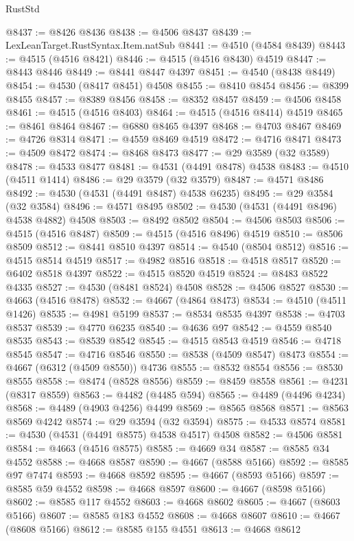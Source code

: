 \begin{lexlean}{RustStd}
\begin{coremodule}
{\begin{coremodule}
{{{{{{{{{{{{{{{{{{{{{{{{{{{{{{{{{{{{{{{{{{{{{{{{{{{{{{{@8437 := @8426 @8436
@8438 := @4506 @8437
@8439 := LexLeanTarget.RustSyntax.Item.natSub
@8441 := @4510 (@4584 @8439)
@8443 := @4515 (@4516 @8421)
@8446 := @4515 (@4516 @8430) @4519
@8447 := @8443 @8446
@8449 := @8441 @8447 @4397
@8451 := @4540 (@8438 @8449)
@8454 := @4530 (@8417 @8451) @4508
@8455 := @8410 @8454
@8456 := @8399 @8455
@8457 := @8389 @8456
@8458 := @8352 @8457
@8459 := @4506 @8458
@8461 := @4515 (@4516 @8403)
@8464 := @4515 (@4516 @8414) @4519
@8465 := @8461 @8464
@8467 := @6880 @8465 @4397
@8468 := @4703 @8467
@8469 := @4726 @8314
@8471 := @4559 @8469 @4519
@8472 := @4716 @8471
@8473 := @4509 @8472
@8474 := @8468 @8473
@8477 := @29 @3589 (@32 @3589)
@8478 := @4533 @8477
@8481 := @4531 (@4491 @8478) @4538
@8483 := @4510 (@4511 @1414)
@8486 := @29 @3579 (@32 @3579)
@8487 := @4571 @8486
@8492 := @4530 (@4531 (@4491 @8487) @4538 @6235)
@8495 := @29 @3584 (@32 @3584)
@8496 := @4571 @8495
@8502 := @4530 (@4531 (@4491 @8496) @4538 @4882) @4508
@8503 := @8492 @8502
@8504 := @4506 @8503
@8506 := @4515 (@4516 @8487)
@8509 := @4515 (@4516 @8496) @4519
@8510 := @8506 @8509
@8512 := @8441 @8510 @4397
@8514 := @4540 (@8504 @8512)
@8516 := @4515 @8514 @4519
@8517 := @4982 @8516
@8518 := @4518 @8517
@8520 := @6402 @8518 @4397
@8522 := @4515 @8520 @4519
@8524 := @8483 @8522 @4335
@8527 := @4530 (@8481 @8524) @4508
@8528 := @4506 @8527
@8530 := @4663 (@4516 @8478)
@8532 := @4667 (@4864 @8473)
@8534 := @4510 (@4511 @1426)
@8535 := @4981 @5199
@8537 := @8534 @8535 @4397
@8538 := @4703 @8537
@8539 := @4770 @6235
@8540 := @4636 @97
@8542 := @4559 @8540 @8535
@8543 := @8539 @8542
@8545 := @4515 @8543 @4519
@8546 := @4718 @8545
@8547 := @4716 @8546
@8550 := @8538 (@4509 @8547) @8473
@8554 := @4667 (@6312 (@4509 @8550)) @4736
@8555 := @8532 @8554
@8556 := @8530 @8555
@8558 := @8474 (@8528 @8556)
@8559 := @8459 @8558
@8561 := @4231 (@8317 @8559)
@8563 := @4482 (@4485 @594)
@8565 := @4489 (@4496 @4234)
@8568 := @4489 (@4903 @4256) @4499
@8569 := @8565 @8568
@8571 := @8563 @8569 @4242
@8574 := @29 @3594 (@32 @3594)
@8575 := @4533 @8574
@8581 := @4530 (@4531 (@4491 @8575) @4538 @4517) @4508
@8582 := @4506 @8581
@8584 := @4663 (@4516 @8575)
@8585 := @4669 @34
@8587 := @8585 @34 @4552
@8588 := @4668 @8587
@8590 := @4667 (@8588 @5166)
@8592 := @8585 @97 @7474
@8593 := @4668 @8592
@8595 := @4667 (@8593 @5166)
@8597 := @8585 @59 @4552
@8598 := @4668 @8597
@8600 := @4667 (@8598 @5166)
@8602 := @8585 @117 @4552
@8603 := @4668 @8602
@8605 := @4667 (@8603 @5166)
@8607 := @8585 @183 @4552
@8608 := @4668 @8607
@8610 := @4667 (@8608 @5166)
@8612 := @8585 @155 @4551
@8613 := @4668 @8612
}}}}}}}}}}}}}}}}}}}}}}}}}}}}}}}}}}}}}}}}}}}}}}}}}}}}}}}
\end{coremodule}}
\end{coremodule}
\end{lexlean}
